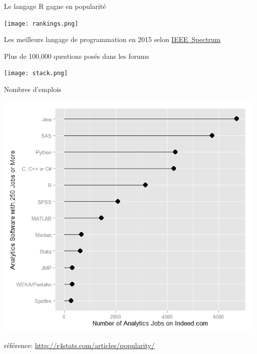 \documentclass[11pt]{beamer}\usepackage[]{graphicx}\usepackage[]{color}
\begin{document}
\begin{frame}{Le langage R gagne en popularit\'{e}}

\vspace{0.1in}

\begin{center}
\texttt{[image: rankings.png]}
\end{center}

\vspace{0.2in}

Les meilleurs langage de programmation en 2015 selon \href{http://spectrum.ieee.org/computing/software/the-2015-top-ten-programming-languages}{\mbox{IEEE Spectrum}} \\
\end{frame}


\begin{frame}{Plus de 100,000 questions pos\'{e}s dans les forums}

\texttt{[image: stack.png]}
\newline
\vspace{0.1in}
\end{frame}




\begin{frame}{Nombres d'emplois}

\begin{center}
\includegraphics[scale=0.47]{jobs.png}
\end{center}

\vspace{0.05in}

r\'{e}f\'{e}rence: \href{http://r4stats.com/articles/popularity/}{http://r4stats.com/articles/popularity/}\\

\end{frame}
\end{document}
